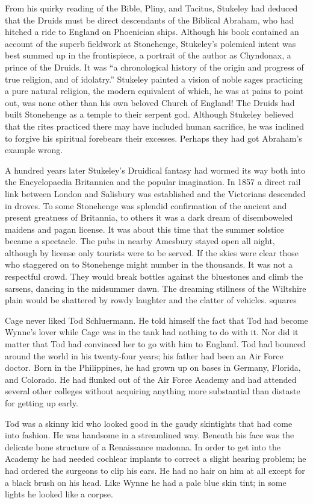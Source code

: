 From his quirky reading of the Bible, Pliny, and Tacitus, Stukeley had deduced that the Druids must be direct descendants of the Biblical Abraham, who had hitched a ride to England on Phoenician ships. Although his book contained an account of the superb fieldwork at Stonehenge, Stukeley’s polemical intent was best summed up in the frontispiece, a portrait of the author as Chyndonax, a prince of the Druids. It was “a chronological history of the origin and progress of true religion, and of idolatry.” Stukeley painted a vision of noble sages practicing a pure natural religion, the modern equivalent of which, he was at pains to point out, was none other than his own beloved Church of England! The Druids had built Stonehenge as a temple to their serpent god. Although Stukeley believed that the rites practiced there may have included human sacrifice, he was inclined to forgive his spiritual forebears their excesses. Perhaps they had got Abraham’s example wrong.

A hundred years later Stukeley’s Druidical fantasy had wormed its way both into the Encyclopaedia Britannica and the popular imagination. In 1857 a direct rail link between London and Salisbury was established and the Victorians descended in droves. To some Stonehenge was splendid confirmation of the ancient and present greatness of Britannia, to others it was a dark dream of disemboweled maidens and pagan license. It was about this time that the summer solstice became a spectacle. The pubs in nearby Amesbury stayed open all night, although by license only tourists were to be served. If the skies were clear those who staggered on to Stonehenge might number in the thousands. It was not a respectful crowd. They would break bottles against the bluestones and climb the sarsens, dancing in the midsummer dawn. The dreaming stillness of the Wiltshire plain would be shattered by rowdy laughter and the clatter of vehicles.
squares

Cage never liked Tod Schluermann. He told himself the fact that Tod had become Wynne’s lover while Cage was in the tank had nothing to do with it. Nor did it matter that Tod had convinced her to go with him to England. Tod had bounced around the world in his twenty-four years; his father had been an Air Force doctor. Born in the Philippines, he had grown up on bases in Germany, Florida, and Colorado. He had flunked out of the Air Force Academy and had attended several other colleges without acquiring anything more substantial than distaste for getting up early.

Tod was a skinny kid who looked good in the gaudy skintights that had come into fashion. He was handsome in a streamlined way. Beneath his face was the delicate bone structure of a Renaissance madonna. In order to get into the Academy he had needed cochlear implants to correct a slight hearing problem; he had ordered the surgeons to clip his ears. He had no hair on him at all except for a black brush on his head. Like Wynne he had a pale blue skin tint; in some lights he looked like a corpse.

